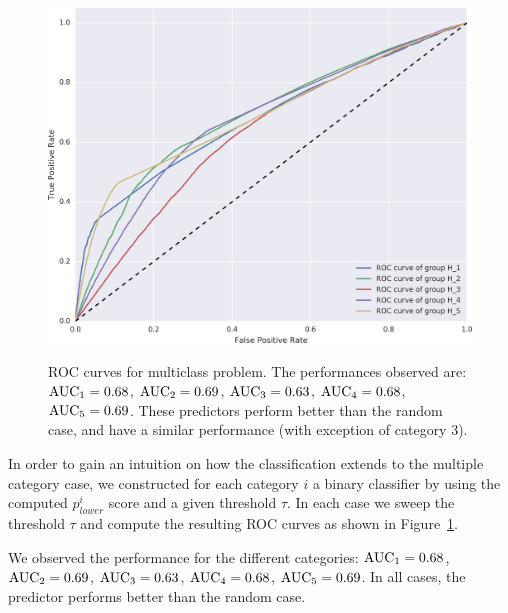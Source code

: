 \begin{figure}[h]
\centering
{\includegraphics[width=0.9\columnwidth]
{figures/ROC_multiclass/ROC_multiclass.png}}
\caption{ROC curves for multiclass problem. The performances observed are: $\operatorname{AUC}_1 = 0.68$, $\operatorname{AUC}_2 = 0.69$, $\operatorname{AUC}_3 = 0.63$, $\operatorname{AUC}_4 = 0.68$, $\operatorname{AUC}_5 = 0.69$. These predictors perform better than the random case, and have a similar performance (with exception of category 3).}
\label{roc_multiple_categories}
\end{figure}

In order to gain an intuition on how the classification extends to the multiple category case, we constructed for each category $i$ a binary classifier by using the computed $p^i_{lower}$ score and a given threshold $\tau$. In each case we sweep the threshold $\tau$ and compute the resulting ROC curves as shown in Figure~\ref{roc_multiple_categories}.

We observed the performance for the different categories: $\operatorname{AUC}_1 = 0.68$, $\operatorname{AUC}_2 = 0.69$, $\operatorname{AUC}_3=0.63$, $\operatorname{AUC}_4 = 0.68$, $\operatorname{AUC}_5 = 0.69$. In all cases, the predictor performs better than the random case.


